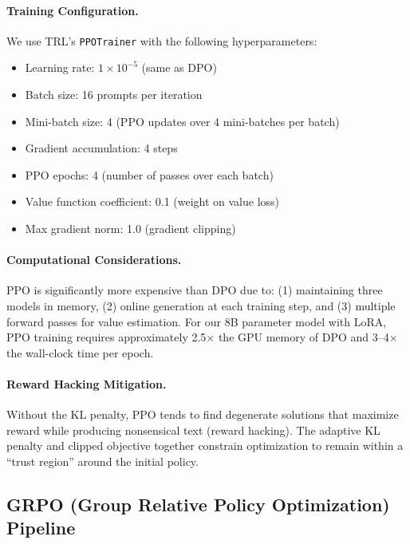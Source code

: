 \paragraph{Training Configuration.} We use TRL's \texttt{PPOTrainer} with the following hyperparameters:
\begin{itemize}[leftmargin=*]
    \item Learning rate: $1 \times 10^{-5}$ (same as DPO)
    \item Batch size: 16 prompts per iteration
    \item Mini-batch size: 4 (PPO updates over 4 mini-batches per batch)
    \item Gradient accumulation: 4 steps
    \item PPO epochs: 4 (number of passes over each batch)
    \item Value function coefficient: 0.1 (weight on value loss)
    \item Max gradient norm: 1.0 (gradient clipping)
\end{itemize}

\paragraph{Computational Considerations.} PPO is significantly more expensive than DPO due to: (1) maintaining three models in memory, (2) online generation at each training step, and (3) multiple forward passes for value estimation. For our 8B parameter model with LoRA, PPO training requires approximately 2.5$\times$ the GPU memory of DPO and 3--4$\times$ the wall-clock time per epoch.

\paragraph{Reward Hacking Mitigation.} Without the KL penalty, PPO tends to find degenerate solutions that maximize reward while producing nonsensical text (reward hacking). The adaptive KL penalty and clipped objective together constrain optimization to remain within a ``trust region'' around the initial policy.

\subsection{GRPO (Group Relative Policy Optimization) Pipeline}
\label{sec:appendix_grpo_pipeline}

